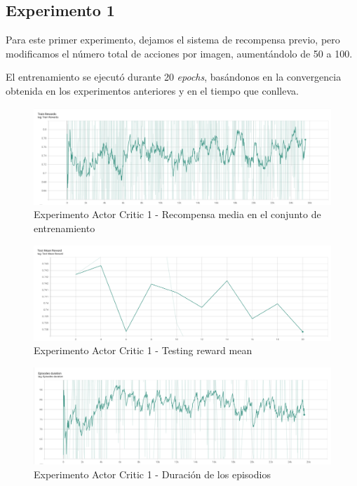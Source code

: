 \subsection{Experimento 1}
\label{resultados-actor-critic-experimento-1}

Para este primer experimento, dejamos el sistema de recompensa previo, pero modificamos el número total de acciones por imagen, aumentándolo de 50 a 100.
\medskip

El entrenamiento se ejecutó durante 20 \textit{epochs}, basándonos en la convergencia obtenida en los experimentos anteriores y en el tiempo que conlleva.
\medskip

\begin{figure}[H]
	\centering
	\includegraphics[width=1\textwidth]{figuras/experiments/actor_critic/actor_critic_20_epochs/train_rewards.png}
	\caption[Experimento Actor Critic 1 - Recompensa media en el conjunto de entrenamiento]{Experimento Actor Critic 1 - Recompensa media en el conjunto de entrenamiento}
	\label{fig-experimento-actor-critic-1-training-reward-mean}
\end{figure}
\begin{figure}[H]
	\centering
	\includegraphics[width=1\textwidth]{figuras/experiments/actor_critic/actor_critic_20_epochs/test_mean_reward.png}
	\caption[Experimento Actor Critic 1 - Testing reward mean]{Experimento Actor Critic 1 - Testing reward mean}
	\label{fig-experimento-actor-critic-1-testing-reward-mean}
\end{figure}
\begin{figure}[H]
	\centering
	\includegraphics[width=1\textwidth]{figuras/experiments/actor_critic/actor_critic_20_epochs/episodes_duration.png}
	\caption[Experimento Actor Critic 1 - Duración de los episodios]{Experimento Actor Critic 1 - Duración de los episodios}
	\label{fig-experimento-actor-critic-1-episodes-duration}
\end{figure}
